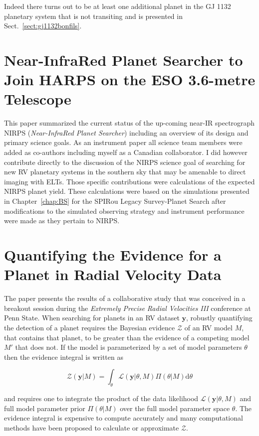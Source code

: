 Indeed there turns out to be at least one additional planet in the GJ 1132
planetary system
that is not transiting and is presented in Sect.~\ref{sect:gj1132bonfils}.

\section{Near-InfraRed Planet Searcher to Join HARPS on the ESO 3.6-metre
  Telescope \citep{bouchy17}}
This paper summarized the current status of the up-coming near-IR spectrograph
NIRPS (\emph{Near-InfraRed Planet Searcher}) including an overview of its design
and primary science goals. As an instrument paper all science team members were
added as co-authors including myself as a Canadian collaborator. I did however
contribute directly to the discussion of the NIRPS science goal of searching
for new RV planetary systems in the southern sky that may be amenable to direct
imaging with ELTs. Those specific contributions were calculations of the
expected NIRPS planet yield. These calculations were based on the simulations
presented in Chapter~\ref{chap:BS} for the
SPIRou Legacy Survey-Planet Search after modifications to the simulated
observing strategy and instrument performance were made as they pertain to
NIRPS.


\section{Quantifying the Evidence for a Planet in Radial Velocity Data
  \citep{nelson18}}
The paper presents the results of a collaborative study that was conceived in
a breakout session during the \emph{Extremely Precise Radial Velocities III}
conference at Penn State. When searching for planets in an RV dataset
$\mathbf{y}$, robustly 
quantifying the detection of a planet requires the Bayesian evidence
$\mathcal{Z}$ of an RV model $M$, that contains that planet, to
be greater than the evidence of a competing model $M'$ that does not. If the
model is parameterized by a set of model parameters $\theta$ then
the evidence integral is written as

\begin{equation}
  \mathcal{Z}(\mathbf{y}|M) = \int_{\theta} \mathcal{L}(\mathbf{y}|\theta,M)
  \Pi(\theta|M) \text{d} \theta
\end{equation}

\noindent and requires one to integrate the product of the data likelihood
$\mathcal{L}(\mathbf{y}|\theta,M)$ and full model parameter prior
$\Pi(\theta|M)$ over the full model parameter space $\theta$.
The evidence integral is expensive to compute accurately and many computational
methods have been proposed to calculate or approximate $\mathcal{Z}$. \\

